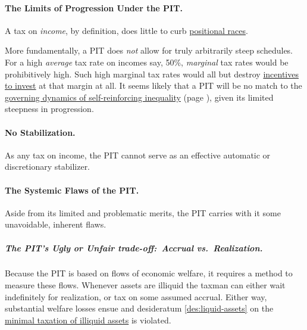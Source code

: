 \paragraph{The Limits of Progression Under the PIT.}
A tax on \emph{income}, by definition, does little to curb \hyperref[sec:positional-race]{positional races}.

More fundamentally, a PIT does \emph{not} allow for truly arbitrarily steep schedules.
For a high \emph{average} tax rate on incomes say, 50\%, \emph{marginal} tax rates would be prohibitively high.
Such high marginal tax rates would all but destroy \hyperref[des:Incentives]{incentives to invest} at that margin at all.
It seems likely that a PIT will be no match to the \hyperref[sec:inequality-dynamics]{governing dynamics of self-reinforcing inequality} (page \pageref{sec:inequality-dynamics}), given its limited steepness in progression.

\paragraph{No Stabilization.}
As any tax on income, the PIT cannot serve as an effective automatic or discretionary stabilizer.

\paragraph{The Systemic Flaws of the PIT.}
Aside from its limited and problematic merits, the PIT carries with it some unavoidable, inherent flaws.

\subparagraph{The PIT's Ugly or Unfair trade-off:~Accrual vs.~Realization.}
Because the PIT is based on flows of economic welfare, it requires a method to measure these flows.
Whenever assets are illiquid
the taxman can either wait indefinitely for realization, or tax on some assumed accrual.
Either way, substantial welfare losses ensue and desideratum \ref{des:liquid-assets} on the \hyperref[des:liquid-assets]{minimal taxation of illiquid assets} is violated.


